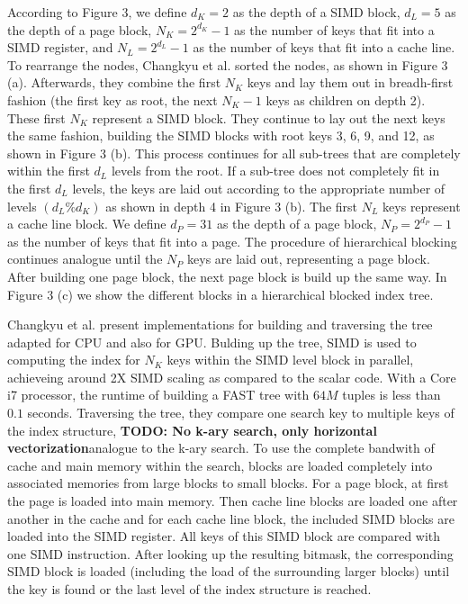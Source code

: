 \documentclass[conference]{IEEEtran}
\begin{document}
According to Figure 3, we define $d_K=2$ as the depth of a SIMD block, $d_L=5$ as the depth of a page block, $N_K=2^{d_K} -1$ as the number of keys that fit into a SIMD register, and $N_L = 2^{d_L} - 1$ as the number of keys that fit into a cache line. To rearrange the nodes, Changkyu et al. sorted the nodes, as shown in Figure 3 (a). Afterwards, they combine the first $N_K$ keys and lay them out in breadh-first fashion (the first key as root, the next $N_K - 1$ keys as children on depth 2). These first $N_K$ represent a SIMD block. They continue to lay out the next keys the same fashion, building the SIMD blocks with root keys 3, 6, 9, and 12, as shown in Figure 3 (b). This process continues for all sub-trees that are completely within the first $d_L$ levels from the root. If a sub-tree does not completely fit in the first $d_L$ levels, the keys are laid out according to the appropriate number of levels $(d_L \% d_K)$ as shown in depth 4 in Figure 3 (b). The first $N_L$ keys represent a cache line block. We define $d_P=31$ as the depth of a page block, $N_P=2^{d_P} -1$ as the number of keys that fit into a page. The procedure of hierarchical blocking continues analogue until the $N_P$ keys are laid out, representing a page block. After building one page block, the next page block is build up the same way. In Figure 3 (c) we show the different blocks in a hierarchical blocked index tree.

Changkyu et al. present implementations for building and traversing the tree adapted for CPU and also for GPU. Bulding up the tree, SIMD is used to computing the index for $N_K$ keys within the SIMD level block in parallel, achieveing around 2X SIMD scaling as compared to the scalar code. With a Core i7 processor, the runtime of building a FAST tree with $64M$ tuples is less than $0.1$ seconds. Traversing the tree, they compare one search key to multiple keys of the index structure, \textbf{TODO: No k-ary search, only horizontal vectorization}analogue to the k-ary search. To use the complete bandwith of cache and main memory within the search, blocks are loaded completely into associated memories from large blocks to small blocks. For a page block, at first the page is loaded into main memory. Then cache line blocks are loaded one after another in the cache and for each cache line block, the included SIMD blocks are loaded into the SIMD register. All keys of this SIMD block are compared with one SIMD instruction. After looking up the resulting bitmask, the corresponding SIMD block is loaded (including the load of the surrounding larger blocks) until the key is found or the last level of the index structure is reached.
\end{document}
